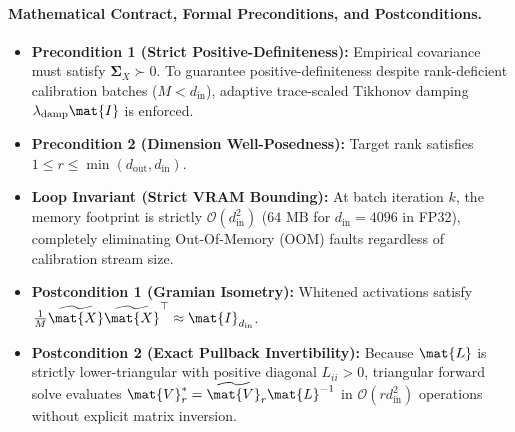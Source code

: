\paragraph{Mathematical Contract, Formal Preconditions, and Postconditions.}
\begin{itemize}
    \item \textbf{Precondition 1 (Strict Positive-Definiteness):} Empirical covariance must satisfy $\bm{\Sigma}_X \succ 0$. To guarantee positive-definiteness despite rank-deficient calibration batches ($M < d_{\text{in}}$), adaptive trace-scaled Tikhonov damping $\lambda_{\text{damp}} \mat{I}$ is enforced.
    \item \textbf{Precondition 2 (Dimension Well-Posedness):} Target rank satisfies $1 \le r \le \min(d_{\text{out}}, d_{\text{in}})$.
    \item \textbf{Loop Invariant (Strict VRAM Bounding):} At batch iteration $k$, the memory footprint is strictly $\mathcal{O}(d_{\text{in}}^2)$ ($64\text{ MB}$ for $d_{\text{in}}=4096$ in FP32), completely eliminating Out-Of-Memory (OOM) faults regardless of calibration stream size.
    \item \textbf{Postcondition 1 (Gramian Isometry):} Whitened activations satisfy $\frac{1}{M}\widetilde{\mat{X}}\widetilde{\mat{X}}^\top \approx \mat{I}_{d_{\text{in}}}$.
    \item \textbf{Postcondition 2 (Exact Pullback Invertibility):} Because $\mat{L}$ is strictly lower-triangular with positive diagonal $L_{ii} > 0$, triangular forward solve evaluates $\mat{V}_r^* = \widetilde{\mat{V}}_r \mat{L}^{-1}$ in $\mathcal{O}(r d_{\text{in}}^2)$ operations without explicit matrix inversion.
\end{itemize}

